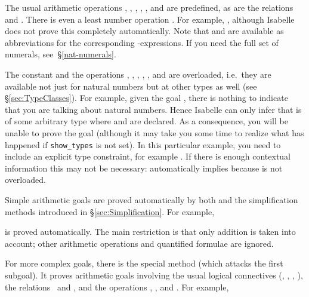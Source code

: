 The usual arithmetic operations ,
, ,
, ,  and
 are predefined, as are the relations
 and
. There is even a least number operation
. For example, , although
Isabelle does not prove this completely automatically. Note that  and
 are available as abbreviations for the corresponding
-expressions. If you need the full set of numerals,
see~\S\ref{nat-numerals}.

\begin{warn}
  The constant  and the operations
  , ,
  , , ,
   and
   are overloaded, i.e.\ they are available
  not just for natural numbers but at other types as well (see
  \S\ref{sec:TypeClasses}). For example, given the goal , there
  is nothing to indicate that you are talking about natural numbers.  Hence
  Isabelle can only infer that  is of some arbitrary type where
   and \isa{+} are declared. As a consequence, you will be unable to
  prove the goal (although it may take you some time to realize what has
  happened if \texttt{show_types} is not set).  In this particular example,
  you need to include an explicit type constraint, for example .  If there is enough contextual information this may not be
  necessary:  automatically implies  because
   is not overloaded.
\end{warn}

Simple arithmetic goals are proved automatically by both 
and the simplification methods introduced in \S\ref{sec:Simplification}.  For
example,

%
is proved automatically. The main restriction is that only addition is taken
into account; other arithmetic operations and quantified formulae are ignored.

For more complex goals, there is the special method
 (which attacks the first subgoal). It proves
arithmetic goals involving the usual logical connectives (\isasymnot,
\isasymand, \isasymor, \isasymimp), the relations \isasymle\ and \isa{<}, and
the operations \isa{+}, \isa{-},  and . For example,

